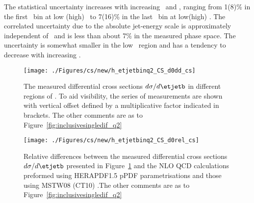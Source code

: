 The statistical uncertainty increases with increasing \etjetb~and \qsq, ranging from 1(8)\% in the first \qsq~bin at low (high) \etjetb~to 7(16)\% in the last \qsq~bin at low(high) \etjetb. The correlated uncertainty due to the absolute jet-energy scale is approximately independent of \etjetb~and is less than about 7\% in the measured phase space. The uncertainty is somewhat smaller in the low \etjetb~region and has a tendency to decrease with increasing \qsq.
\begin{figure}[p]
	\centering
		\texttt{[image: ./Figures/cs/new/h\_etjetbinq2\_CS\_d0dd\_cs]}
	\caption{The measured differential cross sections $d\sigma/d\etjetb$ in different regions of \qsq. To aid visibility, the series of measurements are shown with vertical offset defined by a multiplicative factor indicated in brackets. The other comments are as to Figure~\ref{fig:inclusivesingledif_q2}}
	\label{fig:inclusive_doubledif}
\end{figure}


\begin{figure}[p]
	\centering
		\texttt{[image: ./Figures/cs/new/h\_etjetbinq2\_CS\_d0rel\_cs]}
  \caption{Relative differences between the measured differential cross sections $d\sigma/d\etjetb$ presented in Figure~\ref{fig:inclusive_doubledif} and the NLO QCD calculations preformed using HERAPDF1.5 pPDF parametrisations and those using MSTW08 (CT10) .The other comments are as to Figure~\ref{fig:inclusivesingledif_q2}}
	\label{fig:inclusive_doubledif_rel}
\end{figure}

